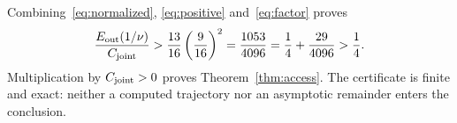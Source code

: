 Combining~\eqref{eq:normalized}, \eqref{eq:positive} and~\eqref{eq:factor} proves
\begin{equation}\label{eq:margin}%
\frac{E_{\rm out}(1/\nu)}{C_{\rm joint}}>
\frac{13}{16}\left(\frac9{16}\right)^2
=\frac{1053}{4096}
=\frac14+\frac{29}{4096}>\frac14.
\end{equation}
Multiplication by $C_{\rm joint}>0$ proves Theorem~\ref{thm:access}.
The certificate is finite and exact: neither a computed trajectory nor an asymptotic remainder enters the conclusion. \hfill\qedsymbol
